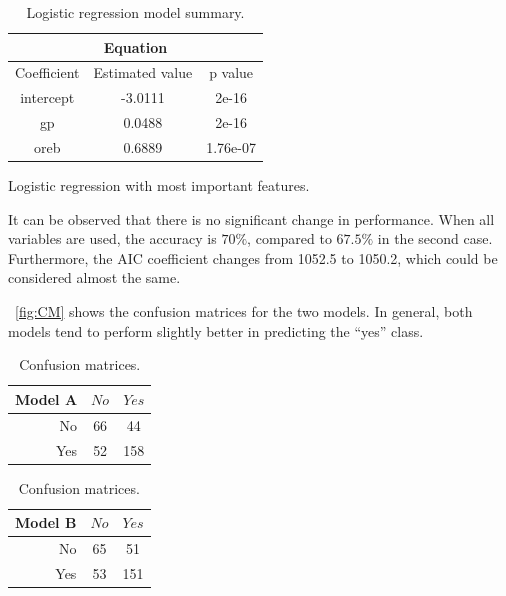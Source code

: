 \begin{table}[h]
	\hfill
	\begin{subtable}[h]{0.4\textwidth}
		\centering
		\begin{tabular}{||c | c | c ||} 
			\hline
			\multicolumn{3}{|c|}{Equation} \\
			\hline
			Coefficient & Estimated value & p value \\
			\hline
			intercept & -3.0111 & 2e-16 \\
			gp & 0.0488 & 2e-16 \\
			oreb & 0.6889 & 1.76e-07 \\		
			\hline
		\end{tabular}
		\caption{Logistic regression with most important features.}
		\label{table:LRImpSum}
	\end{subtable}
	\caption{Logistic regression model summary.}
	\label{table:LRSum}
\end{table}

It can be observed that there is no significant change in performance. When all variables are used, the accuracy is $70\%$, compared to $67.5\%$ in the second case. Furthermore, the AIC coefficient changes from 1052.5 to 1050.2, which could be considered almost the same. 

\Fig~\ref{fig:CM} shows the confusion matrices for the two models. In general, both models tend to perform slightly better in predicting the ``yes'' class.

\begin{table}[h]
	\begin{subtable}[h]{0.4\textwidth}
		\centering
		\begin{tabular}{|| cr | cc ||}    
			\hline
			\multicolumn{2}{|c|}{Model A} 
			& $No$ & $Yes$ \\
			\hline
			& No & 66 & 44 \\
			& Yes & 52 & 158 \\
			\hline
		\end{tabular}
		\label{table:ConfMatModA}
	\end{subtable}
	\hfill
	\begin{subtable}[h]{0.4\textwidth}
		\centering
		\begin{tabular}{|| cr | cc ||}    
			\hline
			\multicolumn{2}{|c|}{Model B} 
			& $No$ & $Yes$ \\
			\hline
			& No & 65 & 51 \\
			& Yes & 53 & 151 \\
			\hline
		\end{tabular}
		\label{table:ConfMatModA}
	\end{subtable}
	\caption{Confusion matrices.}
	\label{table:ConfMat}
\end{table}

